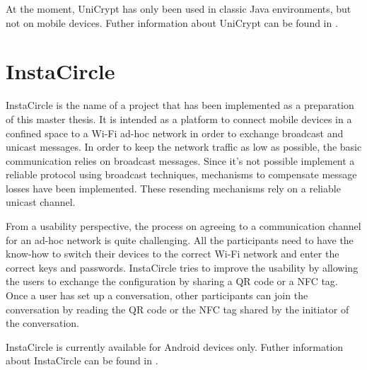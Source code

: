\documentclass[numbers=noenddot, abstract=on]{scrreprt}
\begin{document}
At the moment, UniCrypt has only been used in classic Java environments, but not
on mobile devices. Futher information about UniCrypt can be found in
\cite{ritter12}.

\section{InstaCircle}
InstaCircle is the name of a project that has been implemented as a preparation
of this master thesis. It is intended as a platform to connect mobile devices
in a confined space to a Wi-Fi ad-hoc network in order to exchange broadcast
and unicast messages. In order to keep the network traffic as low as possible,
the basic communication relies on broadcast messages. Since it's not possible
implement a reliable protocol using broadcast techniques, mechanisms to
compensate message losses have been implemented. These resending mechanisms rely
on a reliable unicast channel.

From a usability perspective, the process on agreeing to a communication channel
for an ad-hoc network is quite challenging. All the participants need to have
the know-how to switch their devices to the correct Wi-Fi network and enter the
correct keys and passwords. InstaCircle tries to improve the usability by
allowing the users to exchange the configuration by sharing a QR code or a NFC
tag. Once a user has set up a conversation, other participants can join the
conversation by reading the QR code or the NFC tag shared by the initiator of
the conversation.

InstaCircle is currently available for Android devices only. Futher information
about InstaCircle can be found in \cite{ritter13a}.
\end{document}
